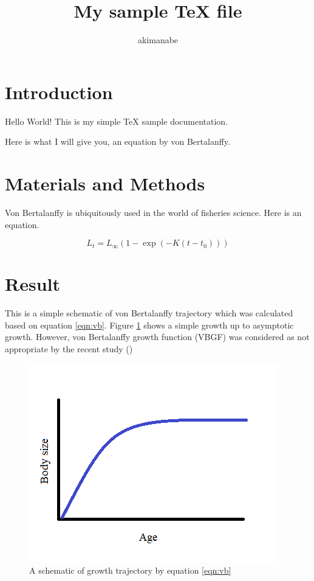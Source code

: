 \documentclass[a4paper,dvipdfmx]{jsarticle}
\begin{document}


\title{My sample TeX file}
\author{akimanabe}
\date{}

\maketitle

\section{Introduction}
Hello World! This is my simple TeX sample documentation.

Here is what I will give you, an equation by von Bertalanffy.

\section{Materials and Methods}

Von Bertalanffy is ubiquitously used in the world of fisheries science. Here is an equation.

\begin{equation}
\label{eqn:vb}
L_t = L_\infty (1-\exp(-K(t-t_0)))
\end{equation}

\section{Result}

This is a simple schematic of von Bertalanffy trajectory which was calculated based on equation \ref{eqn:vb}.
Figure \ref{fig:vb} shows a simple growth up to asymptotic growth.
However, von Bertalanffy growth function (VBGF) was considered as not appropriate by the recent study (\cite{manabe2018-novel})
\begin{figure}
  \includegraphics[width = \linewidth]{figs/samplevb.png}
  \caption{A schematic of growth trajectory by equation \ref{eqn:vb}}
  \label{fig:vb}
\end{figure}


\end{document}
